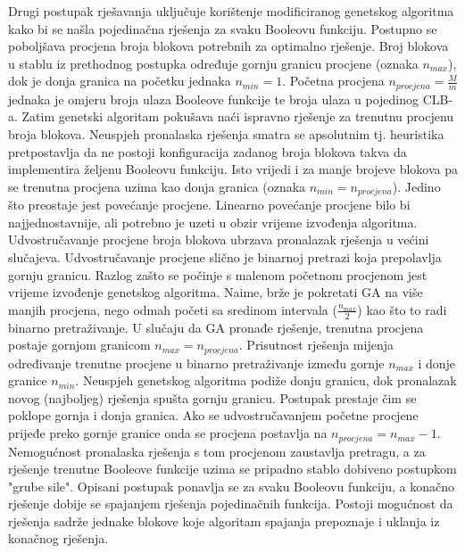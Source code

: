 \documentclass[times, utf8, diplomski]{fer}
\begin{document}
Drugi postupak rješavanja uključuje korištenje modificiranog genetskog algoritma kako bi se našla pojedinačna rješenja za svaku Booleovu funkciju. Postupno se poboljšava procjena broja blokova potrebnih za optimalno rješenje. Broj blokova u stablu iz prethodnog postupka određuje gornju granicu procjene (oznaka $n_{max}$), dok je donja granica na početku jednaka $n_{min}=1$. Početna procjena $n_{procjena}=\frac{M}{m}$ jednaka je omjeru broja ulaza Booleove funkcije te broja ulaza u pojedinog CLB-a. Zatim genetski algoritam pokušava naći ispravno rješenje za trenutnu procjenu broja blokova. Neuspjeh pronalaska rješenja smatra se apsolutnim tj. heuristika pretpostavlja da ne postoji konfiguracija zadanog broja blokova takva da implementira željenu Booleovu funkciju. Isto vrijedi i za manje brojeve blokova pa se trenutna procjena uzima kao donja granica (oznaka $n_{min}=n_{procjena}$). Jedino što preostaje jest povećanje procjene. Linearno povećanje procjene bilo bi najjednostavnije, ali potrebno je uzeti u obzir vrijeme izvođenja algoritma. Udvostručavanje procjene broja blokova ubrzava pronalazak rješenja u većini slučajeva. Udvostručavanje procjene slično je binarnoj pretrazi koja prepolavlja gornju granicu. Razlog zašto se počinje s malenom početnom procjenom jest vrijeme izvođenje genetskog algoritma. Naime, brže je pokretati GA na više manjih procjena, nego odmah početi sa sredinom intervala ($\frac{n_{max}}{2}$) kao što to radi binarno pretraživanje. U slučaju da GA pronađe rješenje, trenutna procjena postaje gornjom granicom $n_{max}=n_{procjena}$. Prisutnost rješenja mijenja određivanje trenutne procjene u binarno pretraživanje između gornje $n_{max}$ i donje granice $n_{min}$. Neuspjeh genetskog algoritma podiže donju granicu, dok pronalazak novog (najboljeg) rješenja spušta gornju granicu. Postupak prestaje čim se poklope gornja i donja granica. Ako se udvostručavanjem početne procjene prijeđe preko gornje granice onda se procjena postavlja na $n_{procjena}=n_{max}-1$. Nemogućnost pronalaska rješenja s tom procjenom zaustavlja pretragu, a za rješenje trenutne Booleove funkcije uzima se pripadno stablo dobiveno postupkom "grube sile". Opisani postupak ponavlja se za svaku Booleovu funkciju, a konačno rješenje dobije se spajanjem rješenja pojedinačnih funkcija. Postoji mogućnost da rješenja sadrže jednake blokove koje algoritam spajanja prepoznaje i uklanja iz konačnog rješenja.
\end{document}
